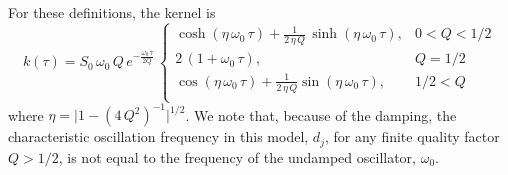 \documentclass[manuscript, letterpaper]{aastex6}
\newcommand{\eqlabel}[1]{\label{eq:#1}}
\begin{document}
For these definitions, the kernel is
\begin{equation}\eqlabel{sho-kernel}
k(\tau) = S_0\,\omega_0\,Q\,e^{-\frac{\omega_0\,\tau}{2Q}}\,
\begin{cases}
    \cosh{(\eta\,\omega_0\,\tau)} +
        \frac{1}{2\,\eta\,Q}\,\sinh{(\eta\,\omega_0\,\tau)}, & 0 < Q < 1/2\\
    2\,(1+\omega_0\,\tau), & Q = 1/2\\
    \cos{(\eta\,\omega_0\,\tau)} +
        \frac{1}{2\,\eta\,Q} \sin{(\eta\,\omega_0\,\tau)},& 1/2 < Q\\
\end{cases}
\end{equation}
where $\eta = \vert 1-(4\,Q^2)^{-1}\vert^{1/2}$.
We note that, because of the damping, the characteristic oscillation frequency
in this model, $d_j$, for any finite quality factor $Q > 1/2$, is not equal to
the frequency of the undamped oscillator, $\omega_0$.
\end{document}
